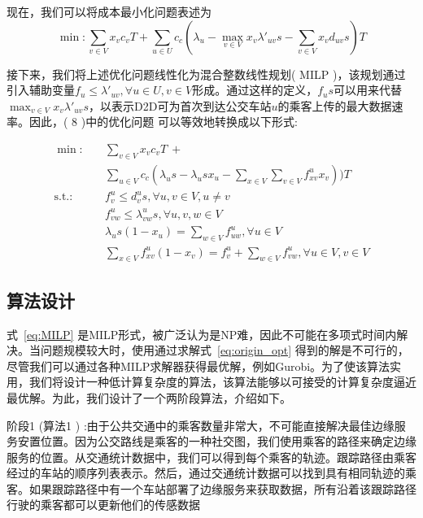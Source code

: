 现在，我们可以将成本最小化问题表述为
\begin{equation}
\min: \sum_{v\in V}x_v c_vT+\sum_{u\in U}c_c(\lambda_u - \max_{v\in V} x_v \lambda'_{uv} s - \sum_{v\in V}x_v d_{uv} s)T
\label{eq:origin_opt}
\end{equation}

接下来，我们将上述优化问题线性化为混合整数线性规划( MILP )，该规划通过引入辅助变量$f_{u} \leq \lambda'_{uv}, \forall u\in U, v\in V$形成。通过这样的定义，$f_u s$可以用来代替$\max_{v\in V} x_v \lambda'_{uv} s$，以表示D2D可为首次到达公交车站$u$的乘客上传的最大数据速率。因此，( 8 )中的优化问题 可以等效地转换成以下形式:

\begin{equation}
\begin{aligned}
\min: &\quad \sum_{v\in V}x_v c_vT \ + \\&\quad \sum_{u\in V}c_c(\lambda_u s -  \lambda_u s x_u - \sum_{x\in V}\sum_{v\in V}f^u_{xv} x_v ))T \\
\text{s.t.:} &\quad  f^u_v \leq d^u_v s, \forall u, v\in V, u\neq v\\
&\quad f^u_{vw} \leq \lambda^u_{vw} s, \forall u, v, w \in V \\
&\quad \lambda_u s (1 - x_u) = \sum_{w\in V}f^u_{uw}, \forall u\in V\\
&\quad \sum_{x\in V}f^u_{xv} (1-x_v) = f^u_v + \sum_{w\in V}f^u_{vw}, \forall u\in V, v\in V
\end{aligned}
\label{eq:MILP}
\end{equation}



\subsection{算法设计}

式~\eqref{eq:MILP} 是MILP形式，被广泛认为是NP难，因此不可能在多项式时间内解决。当问题规模较大时，使用通过求解式~\eqref{eq:origin_opt} 得到的解是不可行的，尽管我们可以通过各种MILP求解器获得最优解，例如Gurobi。为了使该算法实用，我们将设计一种低计算复杂度的算法，该算法能够以可接受的计算复杂度逼近最优解。为此，我们设计了一个两阶段算法，介绍如下。

阶段1 (算法1 ) :由于公共交通中的乘客数量非常大，不可能直接解决最佳边缘服务安置位置。因为公交路线是乘客的一种社交图，我们使用乘客的路径来确定边缘服务的位置。从交通统计数据中，我们可以得到每个乘客的轨迹。跟踪路径由乘客经过的车站的顺序列表表示。然后，通过交通统计数据可以找到具有相同轨迹的乘客。如果跟踪路径中有一个车站部署了边缘服务来获取数据，所有沿着该跟踪路径行驶的乘客都可以更新他们的传感数据

